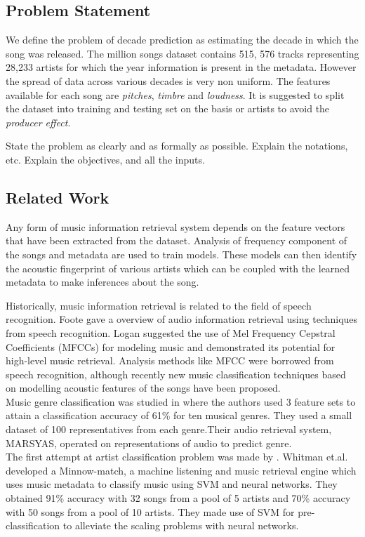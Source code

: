 \documentclass[twocolumn]{article}
\newcommand{\comment}[1]{}
\begin{document}
\subsection{Problem Statement}

We define the problem of decade prediction as estimating the decade in which
the song was released. The million songs dataset contains 515, 576 tracks
representing 28,233 artists for which the year information is present in the
metadata. However the spread of data across various decades is very non
uniform. The features available for each song are \emph{pitches}, \emph{timbre} and
\emph{loudness}.
It is suggested to split the dataset into training and testing set on the basis or artists to
avoid the \emph{producer effect}.


State the problem as clearly and as formally as possible.
Explain the notations, etc.
Explain the objectives, and all the inputs.

\subsection{Related Work}

Any form of music information retrieval system depends on the feature vectors that have been extracted from the dataset. Analysis of frequency component of the songs and metadata are used to train models. These models can then identify the acoustic fingerprint of various artists which can be coupled with the learned metadata to make inferences about the song.

Historically, music information retrieval is related to the field of speech recognition. Foote \cite{Foote} gave a overview of audio information retrieval using techniques from speech recognition. Logan \cite{LOGAN} suggested the use of Mel Frequency Cepstral Coefficients (MFCCs) for modeling music and demonstrated its potential for high-level music retrieval. Analysis methods like MFCC were borrowed from speech recognition, although recently new music classification techniques based on modelling acoustic features of the songs have been proposed.\\
Music genre classification was studied in \cite{GTAN} where the authors used 3 feature sets to attain a classification accuracy of 61\% for ten musical genres. They used a small dataset of 100 representatives from each genre.Their audio retrieval system, MARSYAS, operated on representations of audio to predict genre.\\
The first attempt at artist classification problem was made by \cite{BGS}. Whitman et.al.\cite{BGS} developed a Minnow-match, a machine listening and music retrieval engine which uses music metadata to classify music using SVM and neural networks. They obtained 91\% accuracy with 32 songs from a pool of 5 artists and 70\% accuracy with 50 songs from a pool of 10 artists. They made use of SVM for pre-classification to alleviate the scaling problems with neural networks.
\comment{

Can also comment out paragraphs, etc.

}
\end{document}
